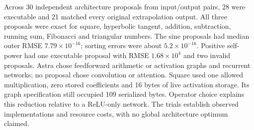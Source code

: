 Across 30 independent architecture proposals from input/output pairs, 28 were executable and 21 matched every original extrapolation output. All three proposals were exact for square, hyperbolic tangent, addition, subtraction, running sum, Fibonacci and triangular numbers. The sine proposals had median outer RMSE $7.79\times10^{-16}$; sorting errors were about $5.2\times10^{-16}$. Positive self-power had one executable proposal with RMSE $1.68\times10^4$ and two invalid proposals. Astra chose feedforward arithmetic or activation graphs and recurrent networks; no proposal chose convolution or attention. Square used one allowed multiplication, zero stored coefficients and 16 bytes of live activation storage. Its graph specification still occupied 109 serialized bytes. Operator choice explains this reduction relative to a ReLU-only network. The trials establish observed implementations and resource costs, with no global architecture optimum claimed.
